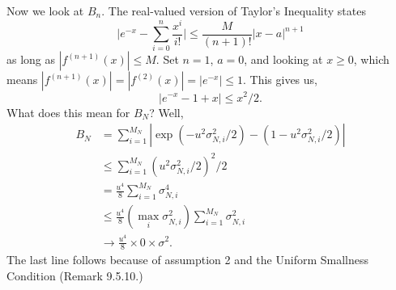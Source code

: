 \documentclass{article}
\begin{document}
Now we look at $B_n$. The real-valued version of Taylor's Inequality states
\[
\bigg\rvert e^{-x} - \sum_{i=0}^n \frac{x^i}{i!}\bigg\rvert \le \frac{M}{(n+1)!} | x-a|^{n+1}
\]
as long as $|f^{(n+1)}(x)| \le M$. Set $n=1$, $a=0$, and looking at $x \ge 0$, which means $|f^{(n+1)}(x)| = |f^{(2)}(x)| = |e^{-x}| \le 1$. This gives us, 
\[
|e^{-x} - 1 + x  | \le x^2/2.
\]
What does this mean for $B_N$? Well,
\begin{align*}
B_N &= \sum_{i=1}^{M_N} |\exp(-u^2 \sigma^2_{N,i}/2) - (1-u^2 \sigma^2_{N,i}/2)| \tag{defn.} \\
&\le \sum_{i=1}^{M_N} \left(u^2 \sigma^2_{N,i}/2 \right)^2/2 \tag{real-valued Taylor's}\\
&= \frac{u^4}{8} \sum_{i=1}^{M_N} \sigma^4_{N,i} \\
&\le \frac{u^4}{8} \left(\max_i \sigma^2_{N,i} \right)\sum_{i=1}^{M_N} \sigma^2_{N,i} \tag{see below} \\
&\to \frac{u^4}{8} \times 0 \times \sigma^2.
\end{align*}
The last line follows because of assumption 2 and the Uniform Smallness Condition (Remark 9.5.10.) 
\end{document}
